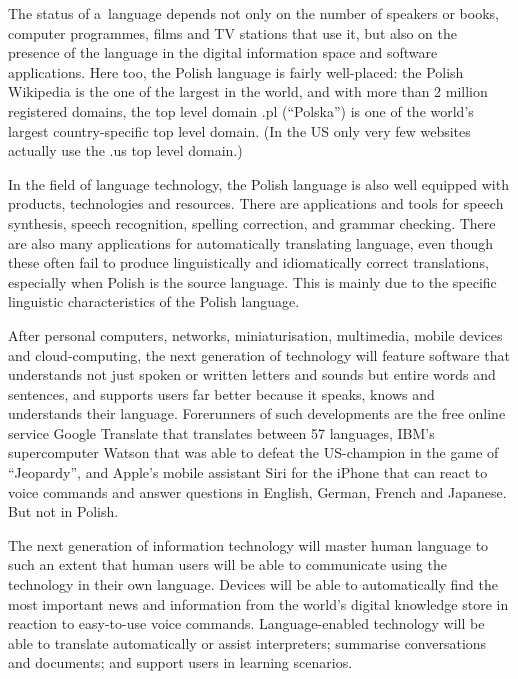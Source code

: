 \begin{multicols}{2}

The status of a~language depends not only on the number of speakers or
books, computer programmes, films and TV stations that use it, but
also on the presence of the language in the digital information space
and software applications. Here too, the Polish language is fairly
well-placed: the Polish Wikipedia is the one of the largest in the
world, and with more than 2 million registered domains, the top level
domain .pl (“Polska”) is one of the world’s largest
country-specific top level domain. (In the US only very few websites
actually use the .us top level domain.)

In the field of language technology, the Polish language is also well
equipped with products, technologies and resources. There are
applications and tools for speech synthesis, speech recognition,
spelling correction, and grammar checking. There are also many
applications for automatically translating language, even though these
often fail to produce linguistically and idiomatically correct
translations, especially when Polish is the source language. This is
mainly due to the specific linguistic characteristics of the Polish
language. 


After personal computers, networks, miniaturisation, multimedia,
mobile devices and cloud-computing, the next generation of technology
will feature software that understands not just spoken or written
letters and sounds but entire words and sentences, and supports users
far better because it speaks, knows and understands their language.
Forerunners of such developments are the free online service Google
Translate that translates between 57 languages, IBM’s supercomputer
Watson that was able to defeat the US-champion in the game of
“Jeopardy”, and Apple’s mobile assistant Siri for the iPhone
that can react to voice commands and answer questions in English,
German, French and Japanese. But not in Polish. 

The next generation of information technology will master human
language to such an extent that human users will be able to
communicate using the technology in their own language. Devices will
be able to automatically find the most important news and information
from the world’s digital knowledge store in reaction to easy-to-use
voice commands. Language-enabled technology will be able to translate
automatically or assist interpreters; summarise conversations and
documents; and support users in learning scenarios. 


\end{multicols}
